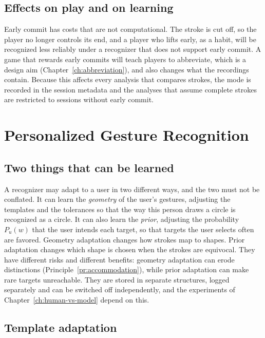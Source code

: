 \section{Effects on play and on learning}

Early commit has costs that are not computational. The stroke is cut off, so the player no longer controls its end, and a player who lifts early, as a habit, will be recognized less reliably under a recognizer that does not support early commit. A game that rewards early commits will teach players to abbreviate, which is a design aim (Chapter~\ref{ch:abbreviation}), and also changes what the recordings contain. Because this affects every analysis that compares strokes, the mode is recorded in the session metadata and the analyses that assume complete strokes are restricted to sessions without early commit.

\chapter{Personalized Gesture Recognition}\label{ch:personalized-recognition}

\section{Two things that can be learned}

A recognizer may adapt to a user in two different ways, and the two must not be conflated. It can learn the \emph{geometry} of the user's gestures, adjusting the templates and the tolerances so that the way this person draws a circle is recognized as a circle. It can also learn the \emph{prior}, adjusting the probability $P_u(w)$ that the user intends each target, so that targets the user selects often are favored. Geometry adaptation changes how strokes map to shapes. Prior adaptation changes which shape is chosen when the strokes are equivocal. They have different risks and different benefits: geometry adaptation can erode distinctions (Principle~\ref{pr:accommodation}), while prior adaptation can make rare targets unreachable. They are stored in separate structures, logged separately and can be switched off independently, and the experiments of Chapter~\ref{ch:human-vs-model} depend on this.

\section{Template adaptation}

